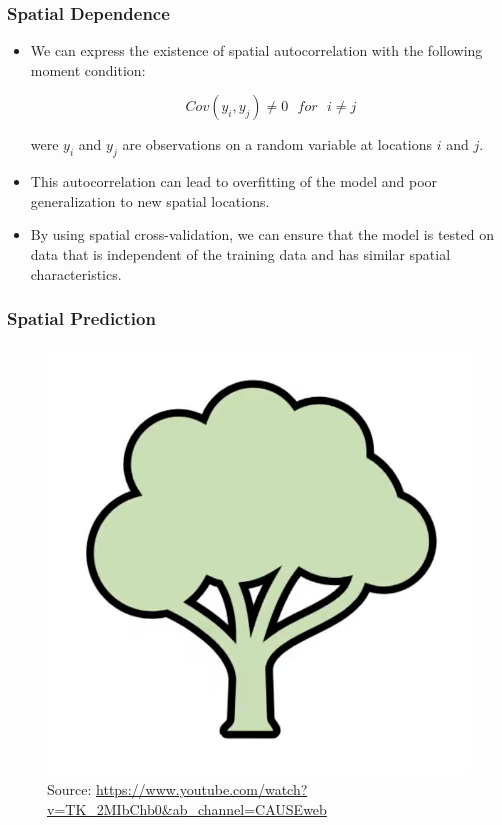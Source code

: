 \documentclass[
  shownotes,
  xcolor={svgnames},
  hyperref={colorlinks,citecolor=DarkBlue,linkcolor=andesred,urlcolor=DarkBlue}
  , aspectratio=169]{beamer}
\begin{document}
\begin{frame}[fragile]
\frametitle{Spatial Dependence}

\begin{itemize}

  \medskip
  \item  We can express the existence of spatial autocorrelation with the following moment condition:
\medskip


\begin{equation}
 Cov(y_{i},y_{j})\neq 0\,\,\,\,for\,\,\,\,i\neq j
\end{equation}

were \(y_i\) and \(y_j\) are observations on a random variable at locations \(i\) and \(j\). 
\medskip
  \item This autocorrelation can lead to overfitting of the model and poor generalization to new spatial locations. 
  \medskip
  \item By using spatial cross-validation, we can ensure that the model is tested on data that is independent of the training data and has similar spatial characteristics.
\end{itemize}

\end{frame}
\begin{frame}[fragile]
\frametitle{Spatial Prediction}

\begin{figure}[H] \centering
            \captionsetup{justification=centering}
    \includegraphics[scale=0.4]{figures/spatial_cross/fig01.png}
\\
\tiny
Source: \url{https://www.youtube.com/watch?v=TK_2MIbChb0&ab_channel=CAUSEweb}
 \end{figure}
\end{frame}
\end{document}

